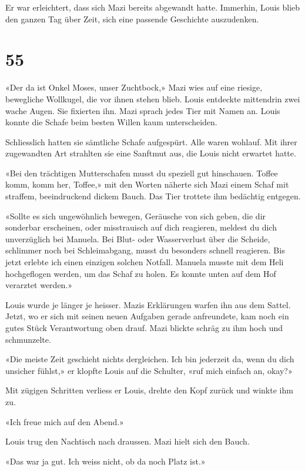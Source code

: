 Er war erleichtert, dass sich Mazi bereits abgewandt hatte. Immerhin,
Louis blieb den ganzen Tag über Zeit, sich eine passende Geschichte
auszudenken.

\chapter{55}\label{section-55}

«Der da ist Onkel Moses, unser Zuchtbock,» Mazi wies auf eine riesige,
bewegliche Wollkugel, die vor ihnen stehen blieb. Louis entdeckte
mittendrin zwei wache Augen. Sie fixierten ihn. Mazi sprach jedes Tier
mit Namen an. Louis konnte die Schafe beim besten Willen kaum
unterscheiden.

Schliesslich hatten sie sämtliche Schafe aufgespürt. Alle waren wohlauf.
Mit ihrer zugewandten Art strahlten sie eine Sanftmut aus, die Louis
nicht erwartet hatte.

«Bei den trächtigen Mutterschafen musst du speziell gut hinschauen.
Toffee komm, komm her, Toffee,» mit den Worten näherte sich Mazi einem
Schaf mit straffem, beeindruckend dickem Bauch. Das Tier trottete ihm
bedächtig entgegen.

«Sollte es sich ungewöhnlich bewegen, Geräusche von sich geben, die dir
sonderbar erscheinen, oder misstrauisch auf dich reagieren, meldest du
dich unverzüglich bei Manuela. Bei Blut- oder Wasserverlust über die
Scheide, schlimmer noch bei Schleimabgang, musst du besonders schnell
reagieren. Bis jetzt erlebte ich einen einzigen solchen Notfall. Manuela
musste mit dem Heli hochgeflogen werden, um das Schaf zu holen. Es
konnte unten auf dem Hof verarztet werden.»

Louis wurde je länger je heisser. Mazis Erklärungen warfen ihn aus dem
Sattel. Jetzt, wo er sich mit seinen neuen Aufgaben gerade anfreundete,
kam noch ein gutes Stück Verantwortung oben drauf. Mazi blickte schräg
zu ihm hoch und schmunzelte.

«Die meiste Zeit geschieht nichts dergleichen. Ich bin jederzeit da,
wenn du dich unsicher fühlst,» er klopfte Louis auf die Schulter, «ruf
mich einfach an, okay?»

Mit zügigen Schritten verliess er Louis, drehte den Kopf zurück und
winkte ihm zu.

«Ich freue mich auf den Abend.»

Louis trug den Nachtisch nach draussen. Mazi hielt sich den Bauch.

«Das war ja gut. Ich weiss nicht, ob da noch Platz ist.»


